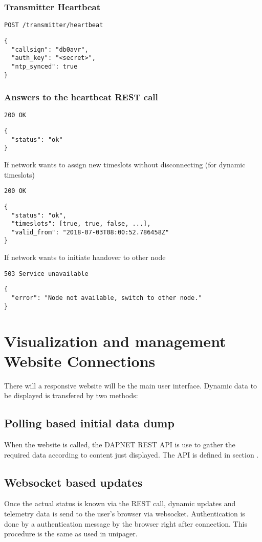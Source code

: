 \documentclass[a4paper]{article}
\begin{document}
\subsubsection{Transmitter Heartbeat}
\texttt{POST /transmitter/heartbeat}
\begin{lstlisting}
{
  "callsign": "db0avr",
  "auth_key": "<secret>",
  "ntp_synced": true
}
\end{lstlisting}

\subsubsection{Answers to the heartbeat REST call}
\texttt{200 OK}
\begin{lstlisting}
{
  "status": "ok"
}
\end{lstlisting}

If network wants to assign new timeslots without disconnecting (for dynamic timeslots)

\texttt{200 OK}
\begin{lstlisting}
{
  "status": "ok",
  "timeslots": [true, true, false, ...],
  "valid_from": "2018-07-03T08:00:52.786458Z"
}
\end{lstlisting}

If network wants to initiate handover to other node

\texttt{503 Service unavailable}
\begin{lstlisting}
{
  "error": "Node not available, switch to other node."
}
\end{lstlisting}

\section{Visualization and management Website Connections}
There will a responsive website will be the main user interface. Dynamic data to be displayed is transfered by two methods:

\subsection{Polling based initial data dump}
When the website is called, the DAPNET REST API is use to gather the required data according to content just displayed. The API is defined in section .

\subsection{Websocket based updates}
Once the actual status is known via the REST call, dynamic updates and telemetry data is send to the user's browser via websocket. Authentication is done by a authentication message by the browser right after connection. This procedure is the same as used in unipager.
\end{document}
